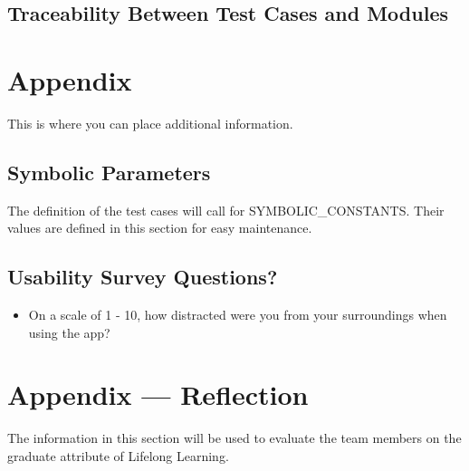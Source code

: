 \documentclass[12pt, titlepage]{article}
\begin{document}
\subsection{Traceability Between Test Cases and Modules}


\printbibliography

\newpage

\section{Appendix}

This is where you can place additional information.

\subsection{Symbolic Parameters}

The definition of the test cases will call for SYMBOLIC\_CONSTANTS.
Their values are defined in this section for easy maintenance.

\subsection{Usability Survey Questions?}

\begin{itemize}
    \item On a scale of 1 - 10, how distracted were you from your surroundings when using the app?
\end{itemize}

\newpage{}
\section*{Appendix --- Reflection}


The information in this section will be used to evaluate the team members on the
graduate attribute of Lifelong Learning.


\end{document}

